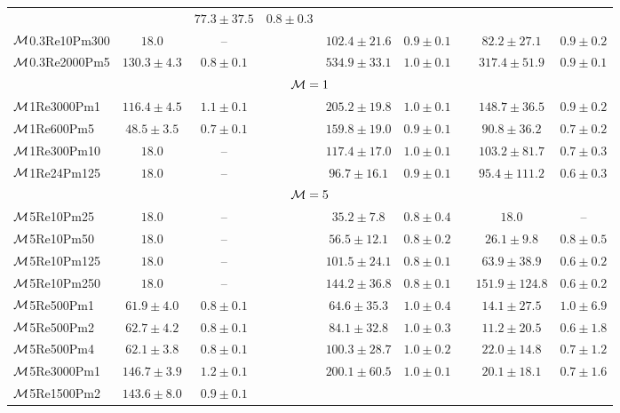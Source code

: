 \begin{table}
{{\begin{threeparttable}
\begin{tabular}{l cc l cc l cc}
	&& $77.3 \pm 37.5$ & $0.8 \pm 0.3$ \\
$\mathcal{M}$0.3Re10Pm300
	& $18.0$ & --
	&& $102.4 \pm 21.6$ & $0.9 \pm 0.1$
	&& $82.2 \pm 27.1$ & $0.9 \pm 0.2$ \\
$\mathcal{M}$0.3Re2000Pm5
	& $130.3 \pm 4.3$ & $0.8 \pm 0.1$
	&& $534.9 \pm 33.1$ & $1.0 \pm 0.1$
	&& $317.4 \pm 51.9$ & $0.9 \pm 0.1$ \\
\hline
\multicolumn{9}{c}{$\mathcal{M} = 1$} \\
\hline
$\mathcal{M}$1Re3000Pm1
	& $116.4 \pm 4.5$ & $1.1 \pm 0.1$
	&& $205.2 \pm 19.8$ & $1.0 \pm 0.1$
	&& $148.7 \pm 36.5$ & $0.9 \pm 0.2$ \\
$\mathcal{M}$1Re600Pm5
	& $48.5 \pm 3.5$ & $0.7 \pm 0.1$
	&& $159.8 \pm 19.0$ & $0.9 \pm 0.1$
	&& $90.8 \pm 36.2$ & $0.7 \pm 0.2$ \\
$\mathcal{M}$1Re300Pm10
	& $18.0$ & --
	&& $117.4 \pm 17.0$ & $1.0 \pm 0.1$
	&& $103.2 \pm 81.7$ & $0.7 \pm 0.3$ \\
$\mathcal{M}$1Re24Pm125
	& $18.0$ & --
	&& $96.7 \pm 16.1$ & $0.9 \pm 0.1$
	&& $95.4 \pm 111.2$ & $0.6 \pm 0.3$ \\
\hline
\multicolumn{9}{c}{$\mathcal{M} = 5$} \\
\hline
$\mathcal{M}$5Re10Pm25
	& $18.0$ & --
	&& $35.2 \pm 7.8$ & $0.8 \pm 0.4$
	&& $18.0$ & -- \\
$\mathcal{M}$5Re10Pm50
	& $18.0$ & --
	&& $56.5 \pm 12.1$ & $0.8 \pm 0.2$
	&& $26.1 \pm 9.8$ & $0.8 \pm 0.5$ \\
$\mathcal{M}$5Re10Pm125
	& $18.0$ & --
	&& $101.5 \pm 24.1$ & $0.8 \pm 0.1$
	&& $63.9 \pm 38.9$ & $0.6 \pm 0.2$ \\
$\mathcal{M}$5Re10Pm250
	& $18.0$ & --
	&& $144.2 \pm 36.8$ & $0.8 \pm 0.1$
	&& $151.9 \pm 124.8$ & $0.6 \pm 0.2$ \\
$\mathcal{M}$5Re500Pm1
	& $61.9 \pm 4.0$ & $0.8 \pm 0.1$
	&& $64.6 \pm 35.3$ & $1.0 \pm 0.4$
	&& $14.1 \pm 27.5$ & $1.0 \pm 6.9$ \\
$\mathcal{M}$5Re500Pm2
	& $62.7 \pm 4.2$ & $0.8 \pm 0.1$
	&& $84.1 \pm 32.8$ & $1.0 \pm 0.3$
	&& $11.2 \pm 20.5$ & $0.6 \pm 1.8$ \\
$\mathcal{M}$5Re500Pm4
	& $62.1 \pm 3.8$ & $0.8 \pm 0.1$
	&& $100.3 \pm 28.7$ & $1.0 \pm 0.2$
	&& $22.0 \pm 14.8$ & $0.7 \pm 1.2$ \\
$\mathcal{M}$5Re3000Pm1
	& $146.7 \pm 3.9$ & $1.2 \pm 0.1$
	&& $200.1 \pm 60.5$ & $1.0 \pm 0.1$
	&& $20.1 \pm 18.1$ & $0.7 \pm 1.6$ \\
$\mathcal{M}$5Re1500Pm2
	& $143.6 \pm 8.0$ & $0.9 \pm 0.1$

\end{tabular}
\end{threeparttable}}}
\end{table}

